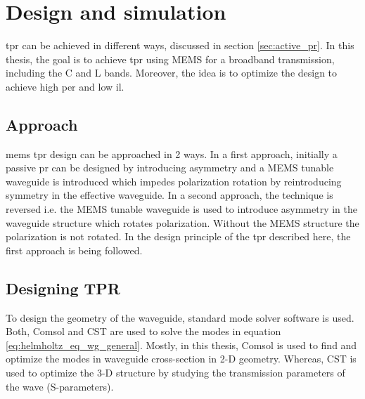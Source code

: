 \documentclass[../report.tex]{subfiles}
\begin{document}
	

\chapter{Design and simulation}
\gls{tpr} can be achieved in different ways, discussed in section \ref*{sec:active_pr}. In this thesis, the goal is to achieve \gls{tpr} using MEMS for a broadband transmission, including the C and L bands. Moreover, the idea is to optimize the design to achieve high \gls{per} and low \gls{il}.  
	
	\section{Approach}
	\gls{mems} \gls{tpr} design can be approached in 2 ways. In a first approach, initially a passive \gls{pr} can be designed by introducing asymmetry and a MEMS tunable waveguide is introduced which impedes polarization rotation by reintroducing symmetry in the effective waveguide. In a second approach, the technique is reversed i.e. the MEMS tunable waveguide is used to introduce asymmetry in the waveguide structure which rotates polarization. Without the MEMS structure the polarization is not rotated. In the design principle of the \gls{tpr} described here, the first approach is being followed.  
	
	\section{Designing TPR}
	To design the geometry of the waveguide, standard mode solver software is used. Both, Comsol\cite{comsol_2015} and CST \cite{cst_2015} are used to solve the modes in equation \ref{eq:helmholtz_eq_wg_general}. Mostly, in this thesis, Comsol is used to find and optimize the modes in waveguide cross-section in 2-D geometry. Whereas, CST is used to optimize the 3-D structure by studying the transmission parameters of the wave (S-parameters).
	
		
\end{document}
